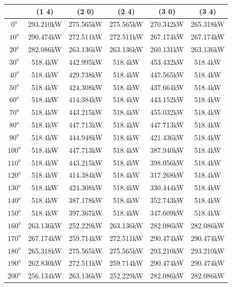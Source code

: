         \begin{table}[H]
        	\centering
        	\begin{tabular}{|c|c|c|c|c|c|} \hline
        			& (1 4)		& (2 0)		& (2 4)		& (3 0)		& (3 4)		\\ \hline
		$0^o$	& 293.210kW	& 275.565kW	& 275.565kW	& 270.342kW	& 265.318kW	\\ \hline
		$10^o$	& 290.474kW	& 272.511kW	& 272.511kW	& 267.174kW	& 267.174kW	\\ \hline
		$20^o$	& 282.086kW	& 263.136kW	& 263.136kW	& 260.131kW	& 263.136kW	\\ \hline
		$30^o$	& 518.4kW	& 442.995kW	& 518.4kW	& 453.432kW	& 518.4kW	\\ \hline
		$40^o$	& 518.4kW	& 429.738kW	& 518.4kW	& 447.565kW	& 518.4kW	\\ \hline
		$50^o$	& 518.4kW	& 424.308kW	& 518.4kW	& 437.664kW	& 518.4kW	\\ \hline
		$60^o$	& 518.4kW	& 414.384kW	& 518.4kW	& 443.152kW	& 518.4kW	\\ \hline
		$70^o$	& 518.4kW	& 443.215kW	& 518.4kW	& 455.032kW	& 518.4kW	\\ \hline
		$80^o$	& 518.4kW	& 447.713kW	& 518.4kW	& 447.713kW	& 518.4kW	\\ \hline
		$90^o$	& 518.4kW	& 444.948kW	& 518.4kW	& 421.436kW	& 518.4kW	\\ \hline
		$100^o$	& 518.4kW	& 447.713kW	& 518.4kW	& 387.940kW	& 518.4kW	\\ \hline
		$110^o$	& 518.4kW	& 443.215kW	& 518.4kW	& 398.056kW	& 518.4kW	\\ \hline
		$120^o$	& 518.4kW	& 414.384kW	& 518.4kW	& 317.268kW	& 518.4kW	\\ \hline
		$130^o$	& 518.4kW	& 424.308kW	& 518.4kW	& 330.444kW	& 518.4kW	\\ \hline
		$140^o$	& 518.4kW	& 387.178kW	& 518.4kW	& 352.743kW	& 518.4kW	\\ \hline
		$150^o$	& 518.4kW	& 397.367kW	& 518.4kW	& 347.609kW	& 518.4kW	\\ \hline
		$160^o$	& 263.136kW	& 252.229kW	& 263.136kW	& 282.086kW	& 282.086kW	\\ \hline
		$170^o$	& 267.174kW	& 259.714kW	& 272.511kW	& 290.474kW	& 290.474kW	\\ \hline
		$180^o$	& 265.318kW	& 275.565kW	& 275.565kW	& 293.210kW	& 293.210kW	\\ \hline
		$190^o$	& 262.830kW	& 272.511kW	& 259.714kW	& 290.474kW	& 290.474kW	\\ \hline
		$200^o$	& 256.134kW	& 263.136kW	& 252.229kW	& 282.086kW	& 282.086kW	\\ \hline

\end{tabular}
\end{table}
